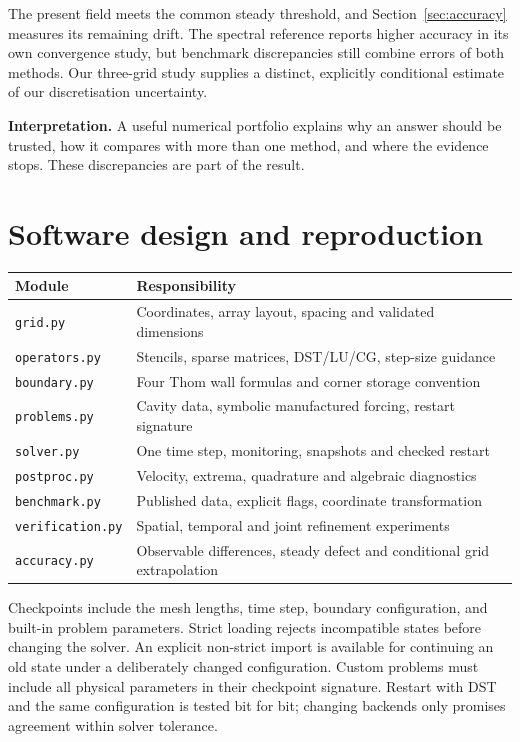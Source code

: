 \documentclass[11pt,a4paper]{article}
\newcommand{\code}[1]{\texttt{#1}}
\newcommand{\takeaway}[1]{\par\smallskip\noindent\colorbox{teal!7}{\parbox{\dimexpr\linewidth-2\fboxsep}{\textbf{\color{teal}Interpretation.} #1}}\par\smallskip}
\begin{document}
The present field meets the common steady threshold, and
Section~\ref{sec:accuracy} measures its remaining drift. The spectral reference reports
higher accuracy in its own convergence study, but benchmark discrepancies
still combine errors of both methods. Our three-grid study supplies a distinct,
explicitly conditional estimate of our discretisation uncertainty.

\takeaway{A useful numerical portfolio explains why an answer should be
trusted, how it compares with more than one method, and where the evidence
stops. These discrepancies are part of the result.}



\clearpage
\section{Software design and reproduction}
\begin{tabularx}{\linewidth}{@{}p{3.5cm}Y@{}}\toprule
Module & Responsibility\\\midrule
\code{grid.py} & Coordinates, array layout, spacing and validated dimensions\\
\code{operators.py} & Stencils, sparse matrices, DST/LU/CG, step-size guidance\\
\code{boundary.py} & Four Thom wall formulas and corner storage convention\\
\code{problems.py} & Cavity data, symbolic manufactured forcing, restart signature\\
\code{solver.py} & One time step, monitoring, snapshots and checked restart\\
\code{postproc.py} & Velocity, extrema, quadrature and algebraic diagnostics\\
\code{benchmark.py} & Published data, explicit flags, coordinate transformation\\
\code{verification.py} & Spatial, temporal and joint refinement experiments\\
\code{accuracy.py} & Observable differences, steady defect and conditional grid extrapolation\\
\bottomrule\end{tabularx}

Checkpoints include the mesh lengths, time step, boundary configuration, and
built-in problem parameters. Strict loading rejects incompatible states before
changing the solver. An explicit non-strict import is available for continuing
an old state under a deliberately changed configuration. Custom problems must
include all physical parameters in their checkpoint signature. Restart with
DST and the same configuration is tested bit for bit; changing backends only
promises agreement within solver tolerance.
\end{document}
